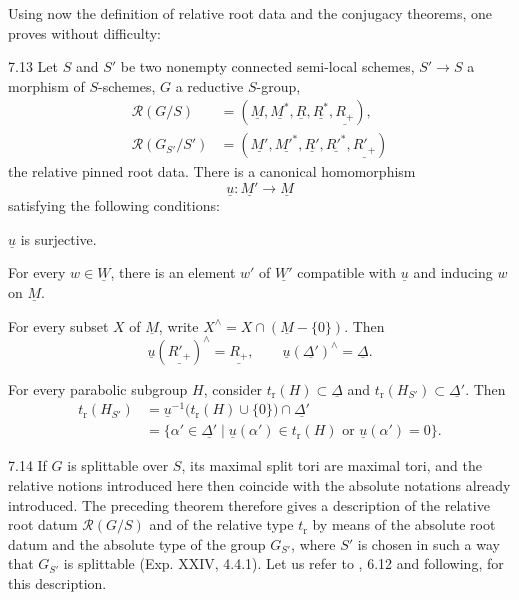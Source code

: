 Using now the definition of relative root data and the conjugacy theorems, one proves without difficulty:

\begin{theorem}{7.13}\label{XXVI.7.13}
Let $S$ and $S'$ be two nonempty connected semi-local schemes, $S'\to S$ a morphism of $S$-schemes, $G$ a reductive $S$-group,
\[
\begin{aligned}
 \mathscr R(G/S)&=(\underline M,\underline{M^*},\underline R,\underline{R^*},\underline{R_+}),\\
 \mathscr R(G_{S'}/S')&=(\underline{M'},\underline{M'^*},\underline{R'},\underline{R'^*},\underline{R'_+})
\end{aligned}
\]
the relative pinned root data. There is a canonical homomorphism
\[
 \underline u:\underline{M'}\to\underline M
\]
satisfying the following conditions:
\begin{enumeratei}
\item $\underline u$ is surjective.
\item For every $w\in\underline W$, there is an element $w'$ of $\underline{W'}$ compatible with $\underline u$ and inducing $w$ on $\underline M$.
\item For every subset $X$ of $\underline M$, write $X^\wedge=X\cap(\underline M-\{0\})$. Then
\[
 \underline u(\underline{R'_+})^\wedge=\underline{R_+},\qquad
 \underline u(\underline{\Delta'})^\wedge=\underline\Delta.
\]
\item For every parabolic subgroup $H$, consider $t_{\mathrm r}(H)\subset\underline\Delta$ and $t_{\mathrm r}(H_{S'})\subset\underline{\Delta'}$. Then
\[
\begin{aligned}
 t_{\mathrm r}(H_{S'})
 &=\underline u^{-1}\bigl(t_{\mathrm r}(H)\cup\{0\}\bigr)\cap\underline{\Delta'}\\
 &=\{\alpha'\in\underline{\Delta'}\mid\underline u(\alpha')\in t_{\mathrm r}(H)
       \text{ or }\underline u(\alpha')=0\}.
\end{aligned}
\]
\end{enumeratei}
\end{theorem}

\begin{remark}{7.14}\label{XXVI.7.14}
If $G$ is splittable over $S$, its maximal split tori are maximal tori, and the relative notions introduced here then coincide with the absolute notations already introduced. The preceding theorem therefore gives a description of the relative root datum $\mathscr R(G/S)$ and of the relative type $t_{\mathrm r}$ by means of the absolute root datum and the absolute type of the group $G_{S'}$, where $S'$ is chosen in such a way that $G_{S'}$ is splittable (\cf Exp. XXIV, 4.4.1). Let us refer to \cite{BT65}, 6.12 and following, for this description.
\end{remark}


